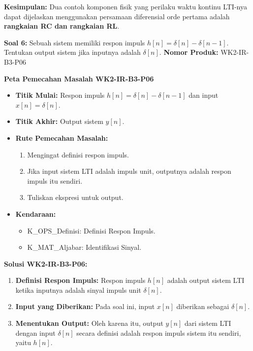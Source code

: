 \documentclass[
  letterpaper,
  DIV=11,
  numbers=noendperiod]{scrreprt}
\providecommand{\tightlist}{%
  \setlength{\itemsep}{0pt}\setlength{\parskip}{0pt}}
\begin{document}
\textbf{Kesimpulan:} Dua contoh komponen fisik yang perilaku waktu
kontinu LTI-nya dapat dijelaskan menggunakan persamaan diferensial orde
pertama adalah \textbf{rangkaian RC dan rangkaian RL}.

\textbf{Soal 6:} Sebuah sistem memiliki respon impuls
\(h[n] = \delta[n] - \delta[n-1]\). Tentukan output sistem jika inputnya
adalah \(\delta[n]\). \textbf{Nomor Produk:} WK2-IR-B3-P06

\textbf{Peta Pemecahan Masalah WK2-IR-B3-P06}

\begin{itemize}
\tightlist
\item
  \textbf{Titik Mulai:} Respon impuls \(h[n] = \delta[n] - \delta[n-1]\)
  dan input \(x[n] = \delta[n]\).
\item
  \textbf{Titik Akhir:} Output sistem \(y[n]\).
\item
  \textbf{Rute Pemecahan Masalah:}

  \begin{enumerate}
  \def\labelenumi{\arabic{enumi}.}
  \tightlist
  \item
    Mengingat definisi respon impuls.
  \item
    Jika input sistem LTI adalah impuls unit, outputnya adalah respon
    impuls itu sendiri.
  \item
    Tuliskan ekspresi untuk output.
  \end{enumerate}
\item
  \textbf{Kendaraan:}

  \begin{itemize}
  \tightlist
  \item
    K\_OPS\_Definisi: Definisi Respon Impuls.
  \item
    K\_MAT\_Aljabar: Identifikasi Sinyal.
  \end{itemize}
\end{itemize}

\textbf{Solusi WK2-IR-B3-P06:}

\begin{enumerate}
\def\labelenumi{\arabic{enumi}.}
\tightlist
\item
  \textbf{Definisi Respon Impuls:} Respon impuls \(h[n]\) adalah output
  sistem LTI ketika inputnya adalah sinyal impuls unit \(\delta[n]\).
\item
  \textbf{Input yang Diberikan:} Pada soal ini, input \(x[n]\) diberikan
  sebagai \(\delta[n]\).
\item
  \textbf{Menentukan Output:} Oleh karena itu, output \(y[n]\) dari
  sistem LTI dengan input \(\delta[n]\) secara definisi adalah respon
  impuls sistem itu sendiri, yaitu \(h[n]\).
\end{enumerate}
\end{document}
